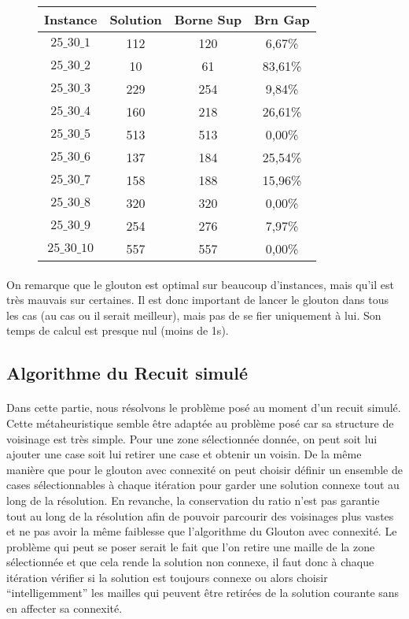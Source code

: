 \documentclass[a4paper, 11pt]{article} %
\begin{document}
\begin{center}
\begin{figure}[H]
      \begin{tabular}{|c|c|c|c|}
      \hline 
        Instance & Solution & Borne Sup & Brn Gap  \\ \hline
$25\_30\_1$ & 112 &  120 &  6,67\% \\ \hline
$25\_30\_2$ & 10 &   61 &   83,61\% \\ \hline
$25\_30\_3$ & 229 &  254 &  9,84\% \\ \hline
$25\_30\_4$ & 160 &  218 &  26,61\% \\ \hline
$25\_30\_5$ & 513 &  513 &  0,00\% \\ \hline
$25\_30\_6$ & 137 &  184 &  25,54\% \\ \hline
$25\_30\_7$ & 158 &  188 &  15,96\% \\ \hline
$25\_30\_8$ & 320 &  320 &  0,00\% \\ \hline
$25\_30\_9$ & 254 &  276 &  7,97\% \\ \hline
$25\_30\_10$ &557 &  557 &  0,00\% \\ \hline
      \end{tabular}
\end{figure}
\end{center}

\paragraph*{}
On remarque que le glouton est optimal sur beaucoup d'instances, mais qu'il est très mauvais sur certaines. Il est donc important de lancer le glouton dans tous les cas (au cas ou il serait meilleur), mais pas de se fier uniquement à lui. Son temps de calcul est presque nul (moins de 1s).

\subsection{Algorithme du Recuit simulé}

\paragraph{}
Dans cette partie, nous résolvons le problème posé au moment d'un recuit simulé. Cette métaheuristique semble être adaptée au problème posé car sa structure de voisinage est très simple. Pour une zone sélectionnée donnée, on peut soit lui ajouter une case soit lui retirer une case et obtenir un voisin. De la même manière que pour le glouton avec connexité on peut choisir définir un ensemble de cases sélectionnables à chaque itération pour garder une solution connexe tout au long de la résolution. En revanche, la conservation du ratio n'est pas garantie tout au long de la résolution afin de pouvoir parcourir des voisinages plus vastes et ne pas avoir la même faiblesse que l'algorithme du Glouton avec connexité. Le problème qui peut se poser serait le fait que l'on retire une maille de la zone sélectionnée et que cela rende la solution non connexe, il faut donc à chaque itération vérifier si la solution est toujours connexe ou alors choisir ``intelligemment'' les mailles qui peuvent être retirées de la solution courante sans en affecter sa connexité.
\end{document}
